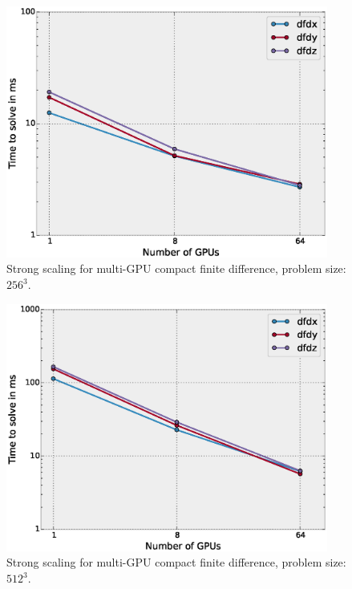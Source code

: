 \documentclass{elsarticle}
\begin{document}
\begin{figure}
\begin{center}
\includegraphics[width=300pt]{fig/strong-scaling-256.eps}
\caption{Strong scaling for multi-GPU compact finite difference, problem size: $256^3$.}
\label{fig:strong-scaling-256}
\end{center}
\end{figure}

\begin{figure}
\begin{center}
\includegraphics[width=300pt]{fig/strong-scaling-512.eps}
\caption{Strong scaling for multi-GPU compact finite difference, problem size: $512^3$.}
\label{fig:strong-scaling-512}
\end{center}
\end{figure}
\end{document}

